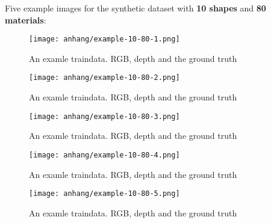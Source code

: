 	\FloatBarrier
	\clearpage
	Five example images for the synthetic dataset with \textbf{10 shapes} and \textbf{80 materials}:
	\begin{figure}[H]
		\centering
		\texttt{[image: anhang/example-10-80-1.png]}
		\caption[An examle traindata. RGB, depth and the ground truth]{An examle traindata. RGB, depth and the ground truth}
	\end{figure}
	\begin{figure}[H]
		\centering
		\texttt{[image: anhang/example-10-80-2.png]}
		\caption[An examle traindata. RGB, depth and the ground truth]{An examle traindata. RGB, depth and the ground truth}
	\end{figure}
	\begin{figure}[H]
		\centering
		\texttt{[image: anhang/example-10-80-3.png]}
		\caption[An examle traindata. RGB, depth and the ground truth]{An examle traindata. RGB, depth and the ground truth}
	\end{figure}
	\begin{figure}[H]
		\centering
		\texttt{[image: anhang/example-10-80-4.png]}
		\caption[An examle traindata. RGB, depth and the ground truth]{An examle traindata. RGB, depth and the ground truth}
	\end{figure}
	\begin{figure}[H]
		\centering
		\texttt{[image: anhang/example-10-80-5.png]}
		\caption[An examle traindata. RGB, depth and the ground truth]{An examle traindata. RGB, depth and the ground truth}
	\end{figure}
	

